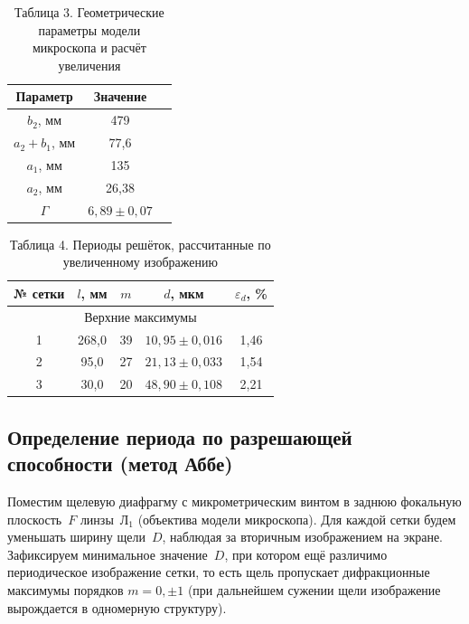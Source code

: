 \documentclass[a4paper]{article}
\begin{document}
\begin{table}[h!]
\centering
\begin{tabular}{|c|c|c|}
\hline
Параметр & Значение \\
\hline
$b_2$, мм & 479 \\
\hline
$a_2 + b_1$, мм & 77,6  \\
\hline
$a_1$, мм & 135  \\
\hline
$a_2$, мм & 26,38 \\
\hline
$\Gamma$ & $6{,}89 \pm 0{,}07$ \\
\hline
\end{tabular}
\caption{Таблица 3. Геометрические параметры модели микроскопа и расчёт увеличения}
\label{tab:geometry_magnification}
\end{table}

\begin{table}[h!]
\centering
\begin{tabular}{|c|c|c|c|c|}
\hline
№ сетки & $l$, мм & $m$ & $d$, мкм & $\varepsilon_d$, \% \\
\hline
\multicolumn{5}{|c|}{Верхние максимумы} \\
\hline 
1 & 268,0 & 39 & $10{,}95 \pm 0{,}016$ & 1,46 \\
\hline
2 & 95,0 & 27 & $21{,}13 \pm 0{,}033$ & 1,54 \\
\hline
3 & 30,0 & 20 & $48{,}90 \pm 0{,}108$ & 2,21 \\
\hline
\end{tabular}
\caption{Таблица 4. Периоды решёток, рассчитанные по увеличенному изображению}
\label{tab:periods_microscope}
\end{table}

\subsection{Определение периода по разрешающей способности (метод Аббе)}

Поместим щелевую диафрагму с микрометрическим винтом в заднюю фокальную плоскость~$F$ линзы~$Л_1$ (объектива модели микроскопа). Для каждой сетки будем уменьшать ширину щели~$D$, наблюдая за вторичным изображением на экране. Зафиксируем минимальное значение~$D$, при котором ещё различимо периодическое изображение сетки, то есть щель пропускает дифракционные максимумы порядков $m = 0, \pm 1$ (при дальнейшем сужении щели изображение вырождается в одномерную структуру).
\end{document}
